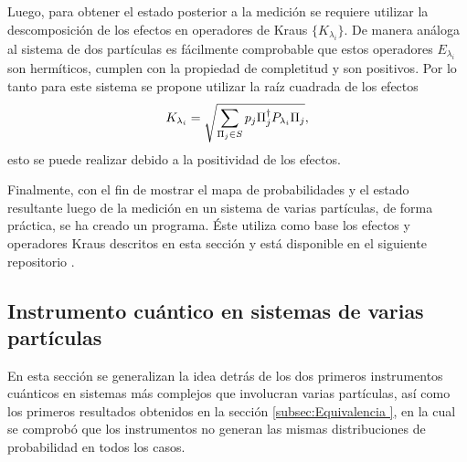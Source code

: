  Luego, para obtener el estado posterior a la medición se requiere utilizar la
descomposición de los efectos en operadores de Kraus $\{K_{\lambda_i}\}$. De
manera análoga al sistema de dos partículas es fácilmente comprobable que estos
operadores $E_{\lambda_i}$ son hermíticos, cumplen con la propiedad de
completitud y son positivos. Por lo tanto para este sistema se propone utilizar
la raíz cuadrada de los efectos 
\begin{equation}
   K_{\lambda_i}=\sqrt{\sum_{\Pi_j \in S} p_j \Pi_{j}^{\dagger}P_{\lambda_i} \Pi_{j}},
\end{equation} 
esto se puede realizar debido a la positividad de los efectos.

Finalmente, con el fin de mostrar el mapa de probabilidades y el estado resultante luego de la medición en un sistema de varias partículas, de forma práctica, se ha creado un programa. Éste utiliza como base los efectos y operadores Kraus descritos en esta sección  y está disponible en el siguiente repositorio {\cite{enlacepropio}}
.


\subsection{Instrumento cuántico en sistemas de varias partículas}  %

En esta sección se generalizan la idea detrás de los dos primeros instrumentos
cuánticos en sistemas más complejos que involucran varias partículas, así como
los primeros resultados obtenidos en la sección {\ref{subsec:Equivalencia }},
en la cual se comprobó que los instrumentos no generan las mismas
distribuciones de probabilidad en todos los casos.

